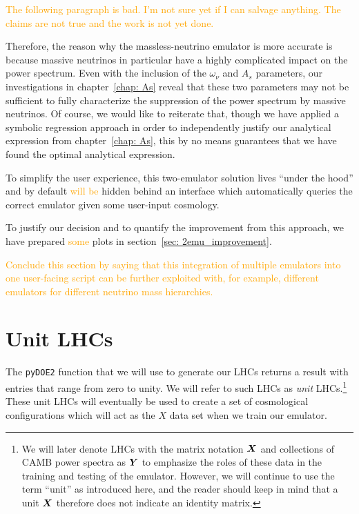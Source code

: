 \textcolor{orange}{The following paragraph is bad. I'm not sure yet if I can
salvage anything. The claims are not true and the work is not yet done.}

Therefore, the reason why the massless-neutrino emulator is more 
accurate is because massive neutrinos in particular have a highly complicated 
impact on the power spectrum. Even with the inclusion of the $\omega_\nu$ and 
$A_s$ parameters, our investigations in chapter~\ref{chap: As} reveal that
these two parameters may not be sufficient to fully characterize the 
suppression of the power spectrum by massive neutrinos. Of course, we would 
like to reiterate that, though we have applied a symbolic regression approach 
in order to independently justify our analytical expression from
chapter~\ref{chap: As}, this by no means guarantees that we have found the optimal analytical expression.

To simplify the user experience, this two-emulator solution lives ``under the
hood'' and by default \textcolor{orange}{will be} hidden behind an interface
which automatically queries the correct emulator given some user-input
cosmology.

To justify our decision and to quantify the improvement from this approach, we
have prepared \textcolor{orange}{some} plots in section~\ref{sec: 2emu_improvement}.

\textcolor{orange}{Conclude this section by saying that this integration of multiple emulators into one user-facing script can be further exploited with, for example, different emulators for different neutrino mass hierarchies.}



\section{Unit LHCs}
\label{sec: lhc_flow_chart}

The \verb|pyDOE2| function that we will use to generate our LHCs
returns a result with entries that range from zero to unity. We will refer
to such LHCs as \textit{unit} LHCs.\footnote{We will later denote LHCs with 
the matrix notation $\bm{X}$ and collections of CAMB power spectra as
$\bm{Y}$ to
emphasize the roles of these data in the training and testing of the emulator. 
However, we will continue to use the term ``unit'' as introduced here, and 
the reader should keep in mind that a unit $\bm{X}$ therefore does not
indicate an identity matrix.} These unit LHCs will eventually be used 
to create a set of cosmological configurations which will act as the $X$ data 
set when we train our emulator.

